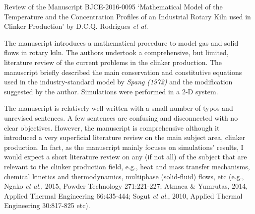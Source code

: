 \documentclass[14pt,twoside]{report}
\begin{document}
\clearpage



\begin{center}
  {\Large Review of the Manuscript BJCE-2016-0095 `Mathematical Model of the Temperature and the Concentration Profiles of an Industrial Rotary Kiln used in Clinker Production' by D.C.Q. Rodrigues {\it et al.}}
\end{center}

\medskip

The manuscript introduces a mathematical procedure to model gas and solid flows in rotary kiln. The authors undertook a comprehensive, but limited, literature review of the current problems in the clinker production. The manuscript briefly described the main conservation and constitutive equations used in the industry-standard model by {\it Spang (1972)} and the modification suggested by the author. Simulations were performed in a 2-D system.

The manuscript is relatively well-written with a small number of typos and unrevised sentences. A few sentences are confusing and disconnected with no clear objectives.  However, the manuscript is comprehensive although it introduced a very superficial literature review on the main subject area, clinker production. In fact, as the manuscript mainly focuses on simulations' results, I would expect a short literature review on any (if not all) of the subject that are relevant to the clinker production field, e.g., heat and mass transfer mechanisms, chemical kinetics and thermodynamics, multiphase (solid-fluid) flows, etc (e.g., Ngako {\it et al.}, 2015, Powder Technology 271:221-227; Atmaca $\&$ Yumrutas, 2014, Applied Thermal Engineering 66:435-444; Sogut {\it et al.}, 2010, Applied Thermal Engineering 30:817-825 etc). 
\end{document}
